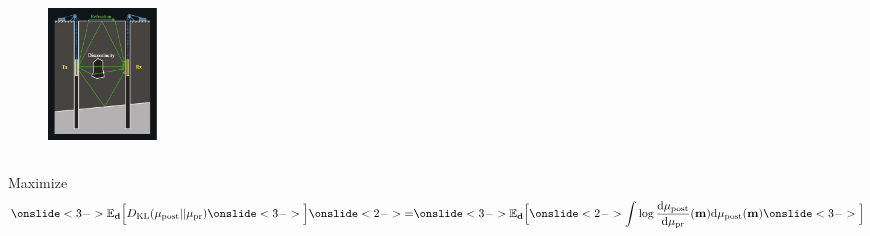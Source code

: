 \documentclass{beamer}
\begin{document}
\begin{frame}
\begin{columns}
\begin{column}{0.5\textwidth}
      \begin{figure}
        \centering
        \includegraphics[width=\linewidth, height=3.5cm]{borehole.png}
      \end{figure}
      
    \end{column}
  \end{columns}
\end{frame}



\begin{frame}
  Maximize 
  \begin{equation*}
    \onslide<3->{\mathbb{E}_{\data} \Big [}D_{\text{KL}} (\post || \pr ) \onslide<3->{\Big ]}
    \onslide<2->{=} \onslide<3->{\mathbb{E}_{\data} \Big [}\onslide<2->{\int \log \frac{\der \post}{\der \pr}(\param) \der \post(\param)}  \onslide<3->{\Big ]}
  \end{equation*}




  
\end{frame}
\end{document}
